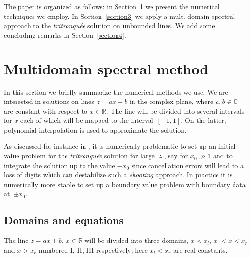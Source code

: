 \documentclass[pdftex]{sigma}
\begin{document}
The paper is organized as follows: in Section~\ref{section2} we present the numerical techniques we employ. In Section~\ref{section3} we apply a multi-domain spectral approach to the \emph{tritronqu\'ee} solution on unbounded
lines. We add some concluding remarks in Section~\ref{section4}.

\section{Multidomain spectral method}\label{section2}

In this section we briefly summarize the numerical methods we use. We are interested in solutions on lines $z=ax+b$ in the complex plane, where $a,b\in\mathbb{C}$ are constant with respect to $x\in\mathbb{R}$. The line will be divided into several intervals for $x$ each of which will be mapped to the inter\-val~$[-1,1]$. On the latter, polynomial interpolation is used to approximate the solution.

As discussed for instance in \cite{FW}, it is numerically problematic to set up an initial value problem for the \emph{tritronqu\'ee} solution for large $|z|$, say for $x_{0}\gg1$ and to integrate the solution up to the value $-x_{0}$ since cancellation errors will lead to a loss of digits which can destabilize such a \emph{shooting} approach. In practice it is numerically more stable to set up a boundary value problem with boundary data at~$\pm x_{0}$.

\subsection{Domains and equations}
The line $z=ax+b$, $x\in\mathbb{R}$ will be divided into three domains, $x<x_{l}$, $x_{l}<x<x_{r}$ and $x>x_{r}$ numbered I, II, III respectively; here $x_{l}<x_{r}$ are real constants.
\end{document}

